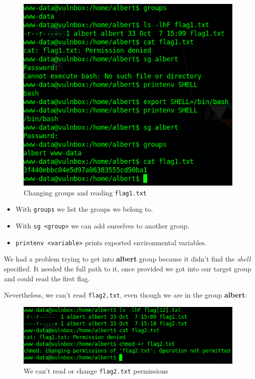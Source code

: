 \documentclass[12pt]{article}
\begin{document}
    \begin{figure}[H]\label{pic:47-flag1}
        \centering
        \includegraphics[width=1.00\textwidth]{47-flag1.png}
        \caption{Changing groups and reading \texttt{flag1.txt}}
    \end{figure}

    \begin{itemize}
        \item With \verb!groups! we list the groups we belong to.
        \item With \verb!sg <group>! we can add ourselves to another group.
        \item \verb!printenv <variable>! prints exported environmental variables.
    \end{itemize}

    We had a problem trying to get into \textbf{albert} group because it didn't
    find the \textit{shell} specified. It needed the full path to it, once
    provided we got into our target group and could read the first flag.

    Nevertheless, we can't read \texttt{flag2.txt}, even though we are in the
    group \textbf{albert}:

    \begin{figure}[H]\label{pic:48-cat-flag2-forbidden}
        \centering
        \includegraphics[width=1.00\textwidth]{48-cat-flag2-forbidden.png}
        \caption{We can't read or change \texttt{flag2.txt} permissions}
    \end{figure}
\end{document}
